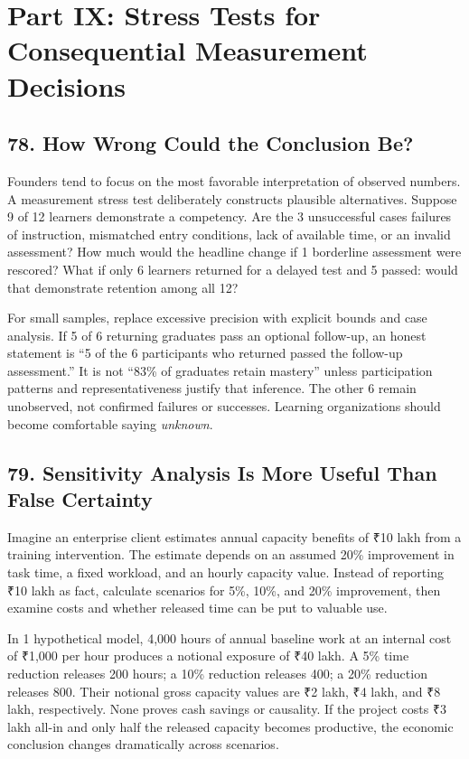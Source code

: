 \section*{Part IX: Stress Tests for Consequential Measurement Decisions}

\subsection*{78. How Wrong Could the Conclusion Be?}

Founders tend to focus on the most favorable interpretation of observed numbers. A measurement stress test deliberately constructs plausible alternatives. Suppose 9 of 12 learners demonstrate a competency. Are the 3 unsuccessful cases failures of instruction, mismatched entry conditions, lack of available time, or an invalid assessment? How much would the headline change if 1 borderline assessment were rescored? What if only 6 learners returned for a delayed test and 5 passed: would that demonstrate retention among all 12?

For small samples, replace excessive precision with explicit bounds and case analysis. If 5 of 6 returning graduates pass an optional follow-up, an honest statement is ``5 of the 6 participants who returned passed the follow-up assessment.'' It is not ``83\% of graduates retain mastery'' unless participation patterns and representativeness justify that inference. The other 6 remain unobserved, not confirmed failures or successes. Learning organizations should become comfortable saying \emph{unknown}.

\subsection*{79. Sensitivity Analysis Is More Useful Than False Certainty}

Imagine an enterprise client estimates annual capacity benefits of ₹10 lakh from a training intervention. The estimate depends on an assumed 20\% improvement in task time, a fixed workload, and an hourly capacity value. Instead of reporting ₹10 lakh as fact, calculate scenarios for 5\%, 10\%, and 20\% improvement, then examine costs and whether released time can be put to valuable use.

In 1 hypothetical model, 4,000 hours of annual baseline work at an internal cost of ₹1,000 per hour produces a notional exposure of ₹40 lakh. A 5\% time reduction releases 200 hours; a 10\% reduction releases 400; a 20\% reduction releases 800. Their notional gross capacity values are ₹2 lakh, ₹4 lakh, and ₹8 lakh, respectively. None proves cash savings or causality. If the project costs ₹3 lakh all-in and only half the released capacity becomes productive, the economic conclusion changes dramatically across scenarios.

